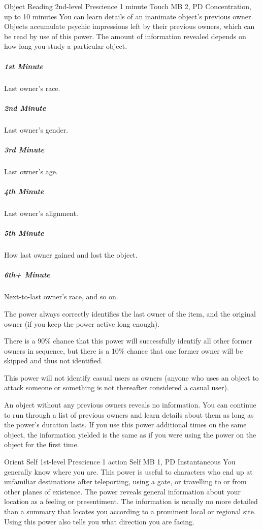 \DndPowerHeader%
  {Object Reading}
  {2nd-level Prescience}
  {1 minute}
  {Touch}
  {MB 2, PD \lvltwo}
  {Concentration, up to 10 minutes}
  You can learn details of an inanimate object's previous owner.
  Objects accumulate psychic impressions
  left by their previous owners,
  which can be read by use of this power.
  The amount of information revealed depends
  on how long you study a particular object.

  \subparagraph{1st Minute}
    Last owner's race.
  \subparagraph{2nd Minute}
    Last owner's gender.
  \subparagraph{3rd Minute}
    Last owner's age.
  \subparagraph{4th Minute}
    Last owner's alignment.
  \subparagraph{5th Minute}
    How last owner gained and lost the object.
  \subparagraph{6th+ Minute}
    Next-to-last owner's race, and so on.
  
  The power always correctly identifies the last owner of the item,
  and the original owner
  (if you keep the power active long enough).
  
  There is a 90\% chance
  that this power will successfully identify all other former owners
  in sequence,
  but there is a 10\% chance that one former owner
  will be skipped and thus not identified.
  
  This power will not identify casual users as owners
  (anyone who uses an object to attack someone
  or something is not thereafter considered a casual user).
  
  An object without any previous owners reveals no information.
  You can continue to run through a list of previous owners
  and learn details about them as long as the power's duration lasts.
  If you use this power additional times on the same object,
  the information yielded is the same
  as if you were using the power on the object for the first time.

\DndPowerHeader%
  {Orient Self}
  {1st-level Prescience}
  {1 action}
  {Self}
  {MB 1, PD \lvlone}
  {Instantaneous}
You generally know where you are.
This power is useful to characters who end up at unfamiliar destinations
after teleporting,
using a gate,
or travelling to or from other planes of existence.
The power reveals general information about your location
as a feeling or presentiment.
The information is usually no more detailed than a summary
that locates you according to a prominent local or regional site.
Using this power also tells you what direction you are facing.

